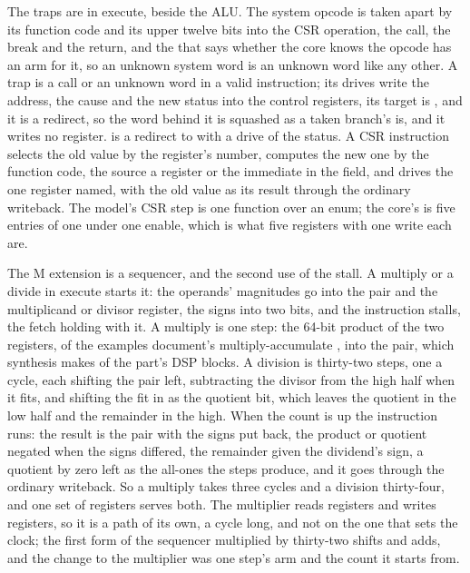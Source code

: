 \documentclass[journal,onecolumn,9pt]{IEEEtran}
\begin{document}
The traps are in execute, beside the ALU. The system opcode is
taken apart by its function code and its upper twelve bits into the
CSR operation, the call, the break and the return, and the
 that says whether the core knows the opcode has an
arm for it, so an unknown system word is an unknown word like any
other. A trap is a call or an unknown word in a valid instruction;
its drives write the address, the cause and the new status into the
control registers, its target is , and it is a redirect,
so the word behind it is squashed as a taken branch's is, and it
writes no register.  is a redirect to  with a
drive of the status. A CSR instruction selects the old value by the
register's number, computes the new one by the function code, the
source a register or the immediate in the  field, and
drives the one register named, with the old value as its result
through the ordinary writeback. The model's CSR step is one function
over an enum; the core's is five entries of one  under
one enable, which is what five registers with one write each are.

The M extension is a sequencer, and the second use of the stall. A
multiply or a divide in execute starts it: the operands' magnitudes
go into the pair and the multiplicand or divisor register, the signs
into two bits, and the instruction stalls, the fetch holding with it.
A multiply is one step: the 64-bit product of the two registers,
 of the examples document's multiply-accumulate
\cite{examples}, into the pair, which synthesis makes of the part's
DSP blocks. A division is thirty-two steps, one a cycle, each shifting
the pair left, subtracting the divisor from the high half when it
fits, and shifting the fit in as the quotient bit, which leaves the
quotient in the low half and the remainder in the high. When the
count is up the instruction runs: the result is the pair with the
signs put back, the product or quotient negated when the signs
differed, the remainder given the dividend's sign, a quotient by
zero left as the all-ones the steps produce, and it goes through the
ordinary writeback. So a multiply takes three cycles and a division
thirty-four, and one set of registers serves both. The multiplier
reads registers and writes registers, so it is a path of its own, a
cycle long, and not on the one that sets the clock; the first form
of the sequencer multiplied by thirty-two shifts and adds, and the
change to the multiplier was one step's arm and the count it starts
from.
\end{document}
